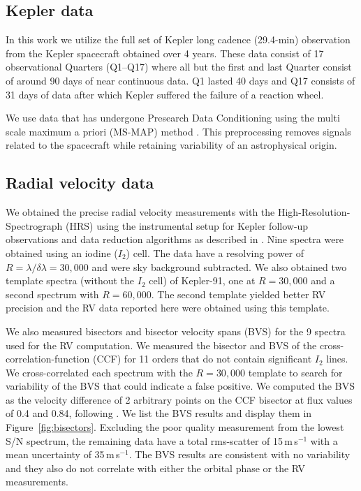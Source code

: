 \documentclass[apjl]{emulateapj}
\begin{document}
\subsection{Kepler data}
In this work we utilize the full set of Kepler long cadence (29.4-min) observation from the Kepler spacecraft obtained over 4 years. These data consist of 17 observational Quarters  (Q1--Q17) where all but the first and last Quarter consist of around 90 days of near continuous data. Q1 lasted 40 days and Q17 consists of  31 days of data after which Kepler suffered the failure of a reaction wheel. 

We use data that has undergone Presearch Data Conditioning \citep{stumpe12,smith12} using the multi scale maximum a priori (MS-MAP) method \citep{stumpe14}. This preprocessing removes signals related to the spacecraft while retaining variability of an astrophysical origin.

\subsection{Radial velocity data}
We obtained the precise radial velocity measurements with the High-Resolution-Spectrograph (HRS) \citep{tull98} using the
instrumental setup for Kepler follow-up observations and data reduction algorithms as described in \citet{endl11}. Nine spectra were obtained using an iodine ($I_2$) cell. The data have a resolving power of $R = \lambda/\delta\lambda = 30,000$ and were sky background subtracted. We also obtained two template spectra (without the $I_2$ cell) of Kepler-91, one at $R=30,000$ and a second spectrum with $R=60,000$. The second template yielded better RV precision and the RV data reported here were obtained using this template.

We also measured bisectors and bisector velocity spans (BVS) for the 9 spectra used for the RV computation. We measured the bisector and BVS of the cross-correlation-function (CCF) for 11 orders that do not contain significant $I_2$ lines. We cross-correlated each spectrum with the $R=30,000$ template to search for variability of the BVS that could indicate a false positive. We computed the BVS as the velocity difference of 2 arbitrary points on the CCF bisector at flux values of 0.4 and 0.84, following \citet{hatzes98}. We list the BVS results and display them in Figure~\ref{fig:bisectors}. Excluding the poor
quality measurement from the lowest S/N spectrum, the remaining data have a total rms-scatter of 15\,m\,s$^{-1}$ with a mean uncertainty of 35\,m\,s$^{-1}$. The BVS results are consistent with no variability and they also do not correlate with either the orbital phase or the RV measurements.
\end{document}
